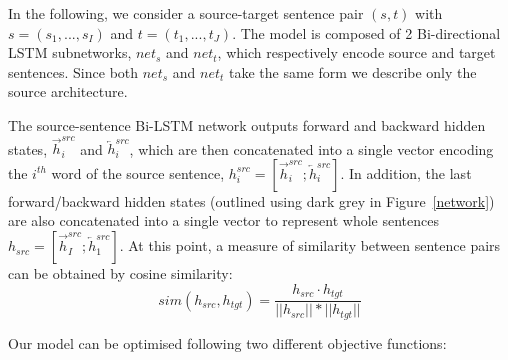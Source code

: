 \documentclass[11pt,a4paper]{article}
\begin{document}
In the following, we consider a source-target sentence pair $(s,t)$ with $s=(s_1,...,s_I)$ and $t=(t_1,...,t_J)$. 
The model is composed of 2 Bi-directional LSTM subnetworks, $net_s$ and $net_t$, which respectively encode source and target sentences. 
Since both $net_s$ and $net_t$ take the same form we describe only the source architecture.

The source-sentence Bi-LSTM network outputs forward and backward hidden states, $\overrightarrow{h}^{src}_i$ and $\overleftarrow{h}^{src}_i$, which are then concatenated into a single vector encoding the $i^{th}$ word of the source sentence, 
$h^{src}_i = [ \overrightarrow{h}^{src}_i ; \overleftarrow{h}^{src}_i ]$.
In addition, the last forward/backward hidden states (outlined using dark grey in Figure~\ref{network}) are also concatenated into a single vector  to represent whole sentences 
$h_{src} = [ \overrightarrow{h}^{src}_I ; \overleftarrow{h}^{src}_1 ]$.
At this point, a measure of similarity between sentence pairs can be obtained by cosine similarity:
\begin{equation}
    sim(h_{src}, h_{tgt}) = \frac{h_{src} \cdotp h_{tgt}}{||h_{src}|| * ||h_{tgt}||}
    \label{cosine}
\end{equation}

Our model can be optimised following two different objective functions:
\end{document}
